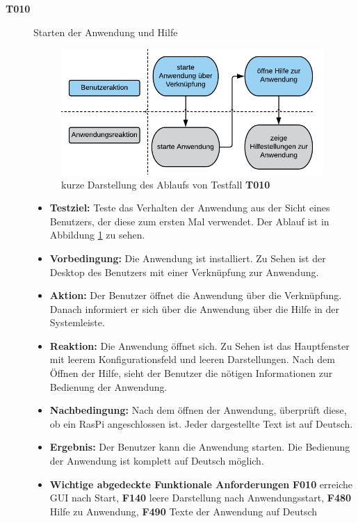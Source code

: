 \documentclass[parskip=full]{scrartcl}
\begin{document}
\begin{description} 

\item[\textbf{T010}]Starten der Anwendung und Hilfe

\begin{figure}[htbp]
	\begin{center}
		\includegraphics[width = 10cm]{Grafik/T010-Ablauf.png}
		\caption{kurze Darstellung des Ablaufs von Testfall \textbf{T010}}
		\label{T010-Ablauf}
	\end{center}
\end{figure}
\begin{itemize}

\item []\textbf{Testziel:} Teste das Verhalten der Anwendung aus der Sicht eines Benutzers, der diese zum ersten Mal verwendet. Der Ablauf ist in Abbildung \ref{T010-Ablauf} zu sehen.

\item []\textbf{Vorbedingung:} Die Anwendung ist installiert. Zu Sehen ist der Desktop des Benutzers mit einer Verknüpfung zur Anwendung.
\item []\textbf{Aktion:} Der Benutzer öffnet die Anwendung über die Verknüpfung. Danach informiert er sich über die Anwendung über die Hilfe in der Systemleiste.
\item []\textbf{Reaktion:} Die Anwendung öffnet sich. Zu Sehen ist das Hauptfenster mit leerem Konfigurationsfeld und leeren Darstellungen. Nach dem Öffnen der Hilfe, sieht der Benutzer die nötigen Informationen zur Bedienung der Anwendung. 
\item []\textbf{Nachbedingung:} Nach dem öffnen der Anwendung, überprüft diese, ob ein \gls{RasPi} angeschlossen ist. Jeder dargestellte Text ist auf Deutsch.

\item []\textbf{Ergebnis:} Der Benutzer kann die Anwendung starten. Die Bedienung der Anwendung ist komplett auf Deutsch möglich.
\item []\textbf{Wichtige abgedeckte Funktionale Anforderungen} \textbf{F010} erreiche GUI nach Start, \textbf{F140} leere Darstellung nach Anwendungsstart, \textbf{F480} Hilfe zu Anwendung, \textbf{F490} Texte der Anwendung auf Deutsch


\end{itemize}
\end{description}
\end{document}
